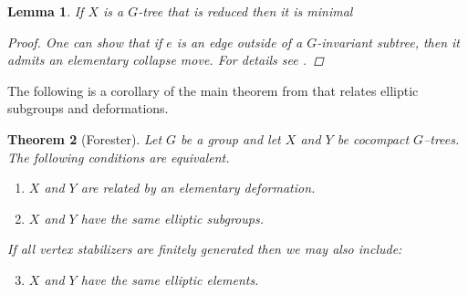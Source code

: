 \documentclass[12pt,parskip=full]{report}
\theoremstyle{plain}
\newtheorem{thm}{Theorem}[section]
\newtheorem{lem}[thm]{Lemma}
\theoremstyle{definition}
\begin{document}
\begin{lem}
    \label{reducedcocompact}
    If \(X\) is a \(G\)-tree that is reduced then it is minimal
    \begin{proof}
    One can show that if \(e\) is an edge outside of a \(G\)-invariant subtree, then it admits an elementary collapse move. For details see \cite{foresterdeformationrigidity}.
    \end{proof}
\end{lem}

The following is a corollary of the main theorem from \cite{foresterdeformationrigidity} that relates elliptic subgroups and deformations.

\begin{thm} [Forester]
    \label{thm:forester}
    Let \(G\) be a group and let \(X\) and \(Y\) be cocompact \(G\)–trees. The following conditions are equivalent.
    \begin{enumerate}
        \item \(X\) and \(Y\) are related by an elementary deformation. 
        \item \(X\) and \(Y\) have the same elliptic subgroups.
    \end{enumerate}
If all vertex stabilizers are finitely generated then we may also include:
\begin{enumerate}
    \setcounter{enumi}{2}
    \item \(X\) and \(Y\) have the same elliptic elements.
\end{enumerate}
\end{thm}
\end{document}
